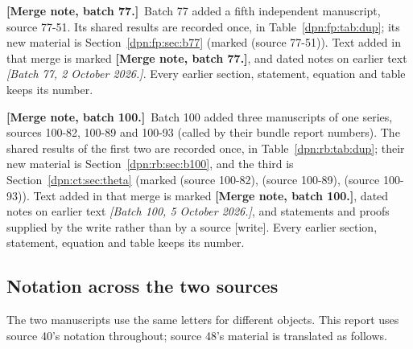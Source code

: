 \documentclass[11pt]{article}
\numberwithin{equation}{section}
\theoremstyle{definition}\newtheorem{definition}[theorem]{Definition}
\theoremstyle{remark}\newtheorem{remark}[theorem]{Remark}
\newcommand{\src}[1]{\textup{(source #1)}}
\newcommand{\mergenotec}[1]{\par\smallskip\noindent\textbf{[Merge note, batch 77.]}\ #1\par\smallskip}
\newcommand{\mergenoted}[1]{\par\smallskip\noindent\textbf{[Merge note, batch 100.]}\ #1\par\smallskip}
\newcommand{\wrt}{\textup{[write]}}
\begin{document}
\mergenotec{Batch 77 added a fifth independent manuscript, source 77-51.
Its shared results are recorded once, in Table~\ref{dpn:fp:tab:dup}; its new
material is Section~\ref{dpn:fp:sec:b77} (marked \src{77-51}).  Text added in
that merge is marked \textbf{[Merge note, batch 77.]}, and dated notes on
earlier text \textit{[Batch 77, 2 October 2026.]}.  Every earlier section,
statement, equation and table keeps its number.}
\mergenoted{Batch 100 added three manuscripts of one series, sources 100-82,
100-89 and 100-93 (called by their bundle report numbers).  The shared results
of the first two are recorded once, in Table~\ref{dpn:rb:tab:dup}; their new
material is Section~\ref{dpn:rb:sec:b100}, and the third is
Section~\ref{dpn:ct:sec:theta} (marked \src{100-82}, \src{100-89},
\src{100-93}).  Text added in that merge is marked \textbf{[Merge note, batch
100.]}, dated notes on earlier text \textit{[Batch 100, 5 October 2026.]}, and
statements and proofs supplied by the write rather than by a source \wrt.
Every earlier section, statement, equation and table keeps its number.}

\subsection{Notation across the two sources}\label{dpn:sec:notation}
The two manuscripts use the same letters for different objects.  This report
uses source 40's notation throughout; source 48's material is translated as
follows.
\end{document}
